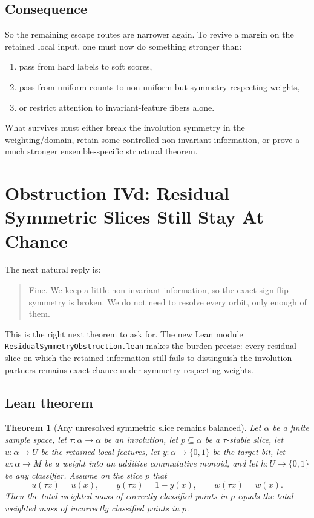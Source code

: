 \documentclass[11pt]{article}
\newtheorem{theorem}{Theorem}[section]
\theoremstyle{remark}
\begin{document}
\subsection{Consequence}

So the remaining escape routes are narrower again.  To revive a margin on the retained local
input, one must now do something stronger than:
\begin{enumerate}[leftmargin=1.5em]
  \item pass from hard labels to soft scores,
  \item pass from uniform counts to non-uniform but symmetry-respecting weights,
  \item or restrict attention to invariant-feature fibers alone.
\end{enumerate}

What survives must either break the involution symmetry in the weighting/domain, retain some
controlled non-invariant information, or prove a much stronger ensemble-specific structural
theorem.

\section{Obstruction IVd: Residual Symmetric Slices Still Stay At Chance}

The next natural reply is:
\begin{quote}
Fine.  We keep a little non-invariant information, so the exact sign-flip symmetry is broken.  We
do not need to resolve every orbit, only enough of them.
\end{quote}

This is the right next theorem to ask for.  The new Lean module
\texttt{ResidualSymmetryObstruction.lean} makes the burden precise: every residual slice on which
the retained information still fails to distinguish the involution partners remains exact-chance
under symmetry-respecting weights.

\subsection{Lean theorem}

\begin{theorem}[Any unresolved symmetric slice remains balanced]
Let \(\alpha\) be a finite sample space, let \(\tau : \alpha \to \alpha\) be an involution, let
\(p \subseteq \alpha\) be a \(\tau\)-stable slice, let \(u : \alpha \to U\) be the retained local
features, let \(y : \alpha \to \{0,1\}\) be the target bit, let \(w : \alpha \to M\) be a weight
into an additive commutative monoid, and let \(h : U \to \{0,1\}\) be any classifier.  Assume on
the slice \(p\) that
\[
  u(\tau x) = u(x), \qquad y(\tau x) = 1-y(x), \qquad w(\tau x) = w(x).
\]
Then the total weighted mass of correctly classified points in \(p\) equals the total weighted
mass of incorrectly classified points in \(p\).
\end{theorem}
\end{document}
